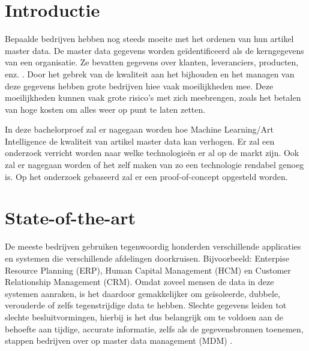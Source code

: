 
\section{Introductie}%
\label{sec:introductie}

Bepaalde bedrijven hebben nog steeds moeite met het ordenen van hun artikel master data. De master data gegevens worden geïdentificeerd als de kerngegevens van een organisatie. Ze bevatten gegevens over klanten, leveranciers, producten, enz. . Door het gebrek van de kwaliteit aan het bijhouden en het managen van deze gegevens hebben grote bedrijven hiee vaak moeilijkheden mee. Deze moeilijkheden kunnen vaak grote risico’s met zich meebrengen, zoals het betalen van hoge kosten om alles weer op punt te laten zetten. 

In deze bachelorproef zal er nagegaan worden hoe Machine Learning/Art Intelligence de kwaliteit van artikel master data kan verhogen. Er zal een onderzoek verricht worden naar welke technologieën er al op de markt zijn. Ook zal er nagegaan worden of het zelf maken van zo een technologie rendabel genoeg is. Op het onderzoek gebaseerd zal er een proof-of-concept opgesteld worden. 


\section{State-of-the-art}%
\label{sec:state-of-the-art}


De meeste bedrijven gebruiken tegenwoordig honderden verschillende applicaties en systemen die verschillende afdelingen doorkruisen. Bijvoorbeeld: Enterpise Resource Planning (ERP), Human Capital Management (HCM) en Customer Relationship Management (CRM). Omdat zoveel mensen de data in deze systemen aanraken, is het daardoor gemakkelijker om geïsoleerde, dubbele, verouderde of zelfs tegenstrijdige data te hebben. Slechte gegevens leiden tot slechte besluitvormingen, hierbij is het dus belangrijk om te voldoen aan de behoefte aan tijdige, accurate informatie, zelfs als de gegevensbronnen toenemen, stappen bedrijven over op master data management (MDM) \autocite{SAP}.

